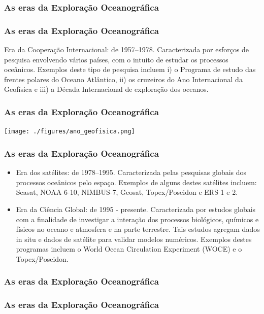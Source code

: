 \begin{frame}
    \frametitle{As eras da Exploração Oceanográfica}
    \centerline{}
\end{frame}

\begin{frame}
    \frametitle{As eras da Exploração Oceanográfica}
    Era da Cooperação Internacional: de 1957--1978. Caracterizada por esforços
    de pesquisa envolvendo vários países, com o intuito de estudar os processos
    oceânicos.  Exemplos deste tipo de pesquisa incluem i) o Programa de estudo
    das frentes polares do Oceano Atlântico, ii) os cruzeiros do Ano
    Internacional da Geofísica e iii) a Década Internacional de exploração dos oceanos.
\end{frame}

\begin{frame}
    \frametitle{As eras da Exploração Oceanográfica}
    \centerline{\texttt{[image: ./figures/ano\_geofisica.png]}}
\end{frame}

\begin{frame}
    \frametitle{As eras da Exploração Oceanográfica}
    \begin{itemize}[<+-| alert@+>]
    \item \small{Era dos satélites: de 1978--1995. Caracterizada pelas pesquisas
           globais dos processos oceânicos pelo espaço. Exemplos de alguns
           destes satélites incluem: Seasat, NOAA 6-10, NIMBUS-7, Geosat,
           Topex/Poseidon e ERS 1 e 2.}

    \item \small{Era da Ciência Global: de 1995 - presente. Caracterizada por
           estudos globais com a finalidade de investigar a interação dos
           processos biológicos, químicos e físicos no oceano e atmosfera e na
           parte terrestre. Tais estudos agregam dados in situ e dados de
           satélite para validar modelos numéricos. Exemplos destes programas
           incluem o World Ocean Circulation Experiment (WOCE) e o
           Topex/Poseidon.}
    \end{itemize}
\end{frame}

\begin{frame}
    \frametitle{As eras da Exploração Oceanográfica}
    \centerline{}
\end{frame}

\begin{frame}
    \frametitle{As eras da Exploração Oceanográfica}
    \centerline{}
\end{frame}

